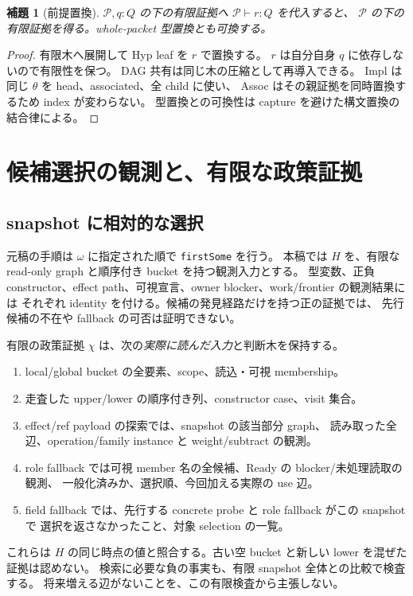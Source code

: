 \documentclass[11pt,a4paper]{article}
\newtheorem{lemma}[definition]{補題}
\begin{document}
\begin{lemma}[前提置換]
\(\mathcal P,q:Q\) の下の有限証拠へ \(\mathcal P\vdash r:Q\) を代入すると、
\(\mathcal P\) の下の有限証拠を得る。whole-packet 型置換とも可換する。
\end{lemma}
\begin{proof}
有限木へ展開して Hyp leaf を \(r\) で置換する。
\(r\) は自分自身 \(q\) に依存しないので有限性を保つ。
DAG 共有は同じ木の圧縮として再導入できる。
Impl は同じ \(\theta\) を head、associated、全 child に使い、
Assoc はその親証拠を同時置換するため index が変わらない。
型置換との可換性は capture を避けた構文置換の結合律による。
\end{proof}

\section{候補選択の観測と、有限な政策証拠}
\label{sec:policy}

\subsection{snapshot に相対的な選択}

元稿の手順は \(\omega\) に指定された順で \texttt{firstSome} を行う。
本稿では \(H\) を、有限な read-only graph と順序付き bucket を持つ観測入力とする。
型変数、正負 constructor、effect path、可視宣言、owner blocker、work/frontier の観測結果には
それぞれ identity を付ける。候補の発見経路だけを持つ正の証拠では、
先行候補の不在や fallback の可否は証明できない。

有限の政策証拠 \(\chi\) は、次の\emph{実際に読んだ入力}と判断木を保持する。
\begin{enumerate}
\item local/global bucket の全要素、scope、読込・可視 membership。
\item 走査した upper/lower の順序付き列、constructor case、visit 集合。
\item effect/ref payload の探索では、snapshot の該当部分 graph、
      読み取った全辺、operation/family instance と weight/subtract の観測。
\item role fallback では可視 member 名の全候補、Ready の blocker/未処理読取の観測、
      一般化済みか、選択順、今回加える実際の use 辺。
\item field fallback では、先行する concrete probe と role fallback がこの snapshot で
      選択を返さなかったこと、対象 selection の一覧。
\end{enumerate}
これらは \(H\) の同じ時点の値と照合する。古い空 bucket と新しい lower を混ぜた証拠は認めない。
検索に必要な負の事実も、有限 snapshot 全体との比較で検査する。
将来増える辺がないことを、この有限検査から主張しない。
\end{document}
